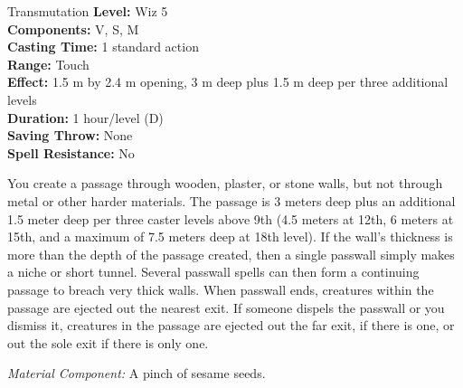 {Transmutation}
{
	\textbf{Level:}
	Wiz 5\\
	\textbf{Components:}
	V, S, M\\
	\textbf{Casting Time:}
	1 standard action\\
	\textbf{Range:}
	Touch\\
	\textbf{Effect:}
	1.5 m by 2.4 m opening, 3 m deep plus 1.5 m deep per three additional levels\\
	\textbf{Duration:}
	1 hour/level (D)\\
	\textbf{Saving Throw:}
	None\\
	\textbf{Spell Resistance:}
	No\\
}
{
	You create a passage through wooden, plaster, or stone walls, but not through metal or other harder materials. The passage is 3 meters deep plus an additional 1.5 meter deep per three caster levels above 9th (4.5 meters at 12th, 6 meters at 15th, and a maximum of 7.5 meters deep at 18th level). If the wall's thickness is more than the depth of the passage created, then a single passwall simply makes a niche or short tunnel. Several passwall spells can then form a continuing passage to breach very thick walls. When passwall ends, creatures within the passage are ejected out the nearest exit. If someone dispels the passwall or you dismiss it, creatures in the passage are ejected out the far exit, if there is one, or out the sole exit if there is only one.

	\textit{Material Component:}
	A pinch of sesame seeds.

}
